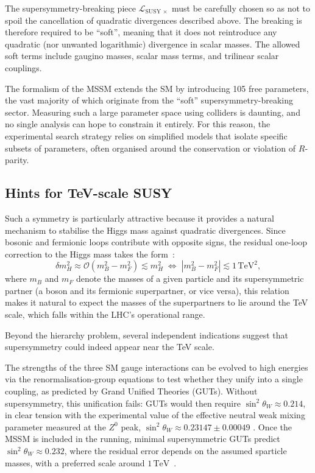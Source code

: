 The supersymmetry-breaking piece $\mathcal{L}_{\mathrm{SUSY}\, \times}$ must be carefully chosen so as not to spoil the cancellation of quadratic divergences described above. The breaking is therefore required to be ``soft'', meaning that it does not reintroduce any quadratic (nor unwanted logarithmic) divergence in scalar masses. The allowed soft terms include gaugino masses, scalar mass terms, and trilinear scalar couplings.

The formalism of the MSSM extends the SM by introducing 105 free parameters, the vast majority of which originate from the ``soft'' supersymmetry-breaking sector. Measuring such a large parameter space using colliders is daunting, and no single analysis can hope to constrain it entirely. For this reason, the experimental search strategy relies on simplified models that isolate specific subsets of parameters, often organised around the conservation or violation of $R$-parity.

\subsection{Hints for TeV-scale SUSY}

Such a symmetry is particularly attractive because it provides a natural mechanism to stabilise the Higgs mass against quadratic divergences. Since bosonic and fermionic loops contribute with opposite signs, the residual one-loop correction to the Higgs mass takes the form~\cite{Ellis:591472}:
\begin{equation}
    \delta m_H^2 \approx \mathcal{O}\!\left( m_B^2 - m_F^2 \right) 
    \lesssim m_H^2 
    \;\Longleftrightarrow\; 
    \left| m_B^2 - m_F^2 \right| \lesssim 1 \, \mathrm{TeV}^2 ,
\end{equation}
where $m_B$ and $m_F$ denote the masses of a given particle and its supersymmetric partner (a boson and its fermionic superpartner, or vice versa), this relation makes it natural to expect the masses of the superpartners to lie around the TeV scale, which falls within the LHC's operational range.

\vspace{0.5 cm}

Beyond the hierarchy problem, several independent indications suggest that supersymmetry could indeed appear near the TeV scale.

The strengths of the three SM gauge interactions can be evolved to high energies via the renormalisation-group equations to test whether they unify into a single coupling, as predicted by Grand Unified Theories (GUTs). Without supersymmetry, this unification fails: GUTs would then require $\sin^2\theta_W \approx 0.214$, in clear tension with the experimental value of the effective neutral weak mixing parameter measured at the $Z^0$ peak, $\sin^2\theta_W \approx 0.23147 \pm 0.00049$ \cite{weakangle_lhcb}. Once the MSSM is included in the running, minimal supersymmetric GUTs predict $\sin^2\theta_W \approx 0.232$, where the residual error depends on the assumed sparticle masses, with a preferred scale around $1\,\mathrm{TeV}$~\cite{KELLEY1991423}.


